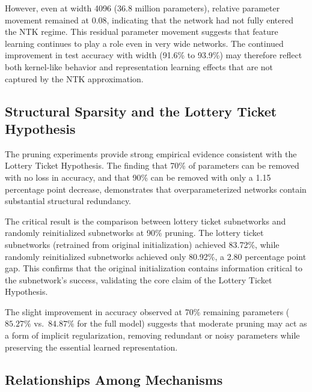 \documentclass[conference]{IEEEtran}
\begin{document}
However, even at width 4096 (36.8 million parameters), relative parameter movement remained at 0.08, indicating that the network had not fully entered the NTK regime. This residual parameter movement suggests that feature learning continues to play a role even in very wide networks. The continued improvement in test accuracy with width (91.6\% to 93.9\%) may therefore reflect both kernel-like behavior and representation learning effects that are not captured by the NTK approximation.

\subsection{Structural Sparsity and the Lottery Ticket Hypothesis}

The pruning experiments provide strong empirical evidence consistent with the Lottery Ticket Hypothesis. The finding that 70\% of parameters can be removed with no loss in accuracy, and that 90\% can be removed with only a 1.15 percentage point decrease, demonstrates that overparameterized networks contain substantial structural redundancy.

The critical result is the comparison between lottery ticket subnetworks and randomly reinitialized subnetworks at 90\% pruning. The lottery ticket subnetworks (retrained from original initialization) achieved 83.72\%, while randomly reinitialized subnetworks achieved only 80.92\%, a 2.80 percentage point gap. This confirms that the original initialization contains information critical to the subnetwork's success, validating the core claim of the Lottery Ticket Hypothesis.

The slight improvement in accuracy observed at 70\% remaining parameters ($85.27\%$ vs.\ $84.87\%$ for the full model) suggests that moderate pruning may act as a form of implicit regularization, removing redundant or noisy parameters while preserving the essential learned representation.

\subsection{Relationships Among Mechanisms}
\end{document}
